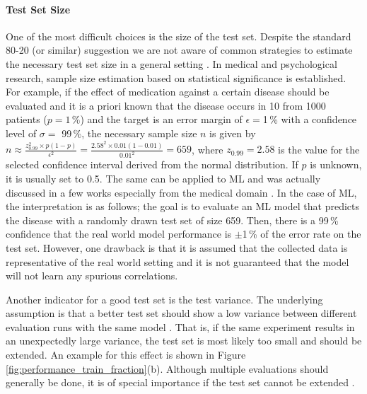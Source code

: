 \paragraph{Test Set Size}
One of the most difficult choices is the size of the test set.
Despite the standard 80-20 (or similar) suggestion we are not aware of common strategies to estimate the necessary test set size in a general setting \citep{Joseph2022_OptimalRatioSplitting}. In medical and psychological research, sample size estimation based on statistical significance is established. For example, if the effect of medication against a certain disease should be evaluated and it is a priori known that the disease occurs in 10 from 1000 patients ($p=1\,\%$) and the target is an error margin of $\epsilon=$1\,\% with a confidence level of $\sigma=$ 99\,\%, the necessary sample size $n$ is given by 
$n \approx \frac{z_{0.99}^2\times p(1-p)}{\epsilon^2}=\frac{2.58^2 \times 0.01(1-0.01)}{0.01^2}=659$, 
where $z_{0.99}=2.58$ is the value for the selected confidence interval derived from the normal distribution. If $p$ is unknown, it is usually set to 0.5.
The same can be applied to \ac{ML} and was actually discussed in a few works especially from the medical domain \citep{Beleites2013_SampleSizePlanning, Dietterich_ApproximateStatisticalTestsSupervisedClassification, Raudys1990_SmallSampleSizeReccomendationPractitioners, Konietschke2021_SmallSampleSize}. 
In the case of ML, the interpretation is as follows; the goal is to evaluate an ML model that predicts the disease with a randomly drawn test set of size 659. Then, there is a 99\,\% confidence that the real world model performance is $\pm$1\,\% of the error rate on the test set. However, one drawback is that it is assumed that the collected data is representative of the real world setting and it is not guaranteed that the model will not learn any spurious correlations. 

Another indicator for a good test set is the test variance. The underlying assumption is that a better test set should show a low variance between different evaluation runs with the same model \citep{Bouthillier2021_Variance}. That is, if the same experiment results in an unexpectedly large variance, the test set is most likely too small and should be extended. An example for this effect is shown in Figure \ref{fig:performance_train_fraction}(b). Although multiple evaluations should generally be done, it is of special importance if the test set cannot be extended \citep{Bouthillier2021_Variance, Raschka2018_ModelEvaluationAndSelection, Lones2021_AvoidMLPitfalls}.


